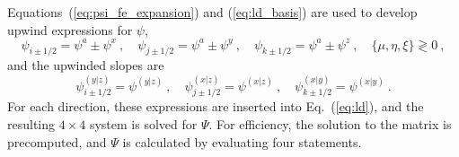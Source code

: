 \documentclass[12pt]{article}
\begin{document}
Equations~(\ref{eq:psi_fe_expansion}) and (\ref{eq:ld_basis}) are used to
develop upwind expressions for $\psi$,
\begin{equation}
  \psi_{i\pm1/2}=\psi^a\pm\psi^x\:,\quad
  \psi_{j\pm1/2}=\psi^a\pm\psi^y\:,\quad \psi_{k\pm1/2}=\psi^a\pm\psi^z\:,\quad
  \{\mu,\eta,\xi\}\gtrless 0\:,
\end{equation}
and the upwinded slopes are
\begin{equation}
  \psi_{i\pm1/2}^{(y|z)}=\psi^{(y|z)}\:,\quad
  \psi_{j\pm1/2}^{(x|z)}=\psi^{(x|z)}\:,\quad
  \psi_{k\pm1/2}^{(x|y)}=\psi^{(x|y)}\:.
\end{equation}
For each direction, these expressions are inserted into Eq.~(\ref{eq:ld}), and
the resulting $4\times4$ system is solved for $\Psi$.  For efficiency, the
solution to the matrix is precomputed, and $\Psi$ is calculated by evaluating
four statements.
\end{document}
